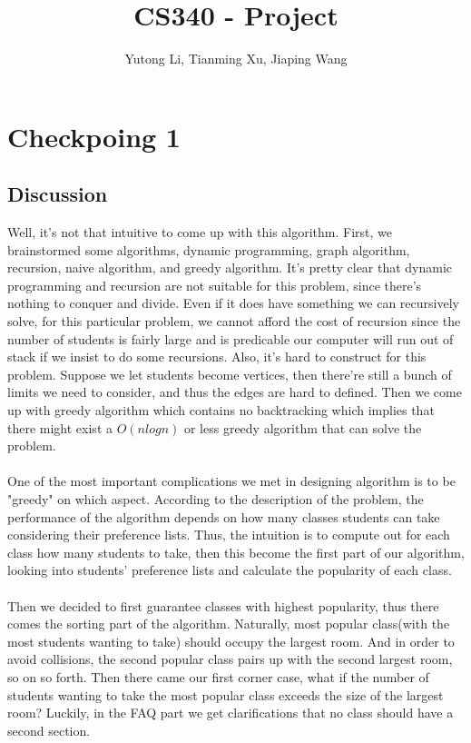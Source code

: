 \documentclass[11pt, oneside]{article}   	%
\title{CS340 - Project}
\author{Yutong Li, Tianming Xu, Jiaping Wang}
\begin{document}
\maketitle

\section{Checkpoing 1}
\subsection{Discussion}
Well, it's not that intuitive to come up with this algorithm. First, we brainstormed some algorithms, dynamic programming, graph algorithm, recursion, naive algorithm, and greedy algorithm. It's pretty clear that dynamic programming and recursion are not suitable for this problem, since there's nothing to conquer and divide. Even if it does have something we can recursively solve, for this particular problem, we cannot afford the cost of recursion since the number of students is fairly large and is predicable our computer will run out of stack if we insist to do some recursions. Also, it's hard to construct for this problem. Suppose we let students become vertices, then there're still a bunch of limits we need to consider, and thus the edges are hard to defined. Then we come up with greedy algorithm which contains no backtracking which implies that there might exist a $O(nlogn)$ or less greedy algorithm that can solve the problem.\\
\\One of the most important complications we met in designing algorithm is to be "greedy" on which aspect. According to the description of the problem, the performance of the algorithm depends on how many classes students can take considering their preference lists. Thus, the intuition is to compute out for each class how many students to take, then this become the first part of our algorithm, looking into students' preference lists and calculate the popularity of each class.\\
\\ Then we decided to first guarantee classes with highest popularity, thus there comes the sorting part of the algorithm. Naturally, most popular class(with the most students wanting to take) should occupy the largest room. And in order to avoid collisions, the second popular class pairs up with the second largest room, so on so forth. Then there came our first corner case, what if the number of students wanting to take the most popular class exceeds the size of the largest room? Luckily, in the FAQ part we get clarifications that no class should have a second section.\\
\end{document}
